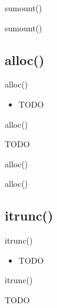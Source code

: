 \documentclass{beamer}
\begin{document}
\begin{frame}{sumount()}
\end{frame}

\begin{frame}{sumount()}
\end{frame}




\subsection{alloc()}

\begin{frame}{alloc()}
    \begin{itemize}
        \item TODO
    \end{itemize}
\end{frame}

\begin{frame}{alloc()}
    \begin{algorithmic}[1]
        \State TODO
    \end{algorithmic}
\end{frame}

\begin{frame}{alloc()}
\end{frame}

\begin{frame}{alloc()}
\end{frame}




\subsection{itrunc()}

\begin{frame}{itrunc()}
    \begin{itemize}
        \item TODO
    \end{itemize}
\end{frame}

\begin{frame}{itrunc()}
    \begin{algorithmic}[1]
        \State TODO
    \end{algorithmic}
\end{frame}
\end{document}
